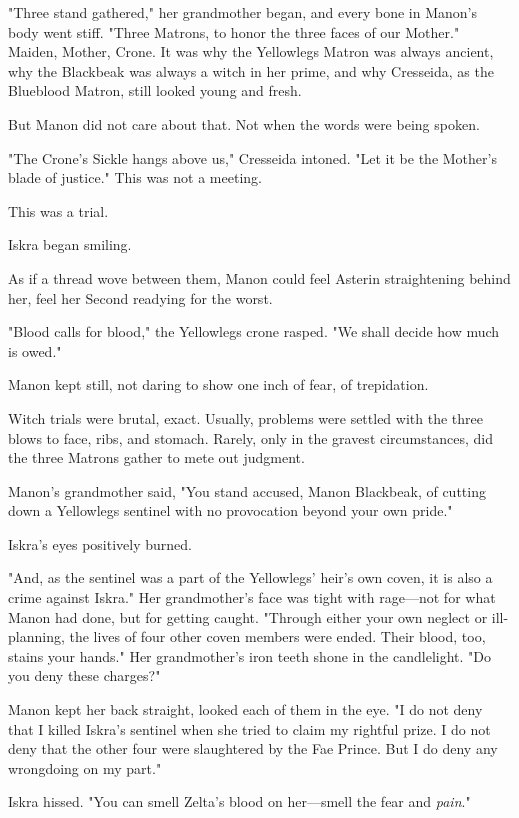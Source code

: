 "Three stand gathered," her grandmother began, and every bone in Manon's body went stiff.
"Three Matrons, to honor the three faces of our Mother."
Maiden, Mother, Crone.
It was why the Yellowlegs Matron was always ancient, why the Blackbeak was always a witch in her prime, and why Cresseida, as the Blueblood Matron, still looked young and fresh.

But Manon did not care about that.
Not when the words were being spoken.

"The Crone's Sickle hangs above us," Cresseida intoned.
"Let it be the Mother's blade of justice."
This was not a meeting.

This was a trial.

Iskra began smiling.

As if a thread wove between them, Manon could feel Asterin straightening behind her, feel her Second readying for the worst.

"Blood calls for blood," the Yellowlegs crone rasped.
"We shall decide how much is owed."

Manon kept still, not daring to show one inch of fear, of trepidation.

Witch trials were brutal, exact.
Usually, problems were settled with the three blows to face, ribs, and stomach.
Rarely, only in the gravest circumstances, did the three Matrons gather to mete out judgment.

Manon's grandmother said, "You stand accused, Manon Blackbeak, of cutting down a Yellowlegs sentinel with no provocation beyond your own pride."

Iskra's eyes positively burned.

"And, as the sentinel was a part of the Yellowlegs' heir's own coven, it is also a crime against Iskra."
Her grandmother's face was tight with rage---not for what Manon had done, but for getting caught.
"Through either your own neglect or ill-planning, the lives of four other coven members were ended.
Their blood, too, stains your hands."
Her grandmother's iron teeth shone in the candlelight.
"Do you deny these charges?"

Manon kept her back straight, looked each of them in the eye.
"I do not deny that I killed Iskra's sentinel when she tried to claim my rightful prize.
I do not deny that the other four were slaughtered by the Fae Prince.
But I do deny any wrongdoing on my part."

Iskra hissed.
"You can smell Zelta's blood on her---smell the fear and \emph{pain}."

